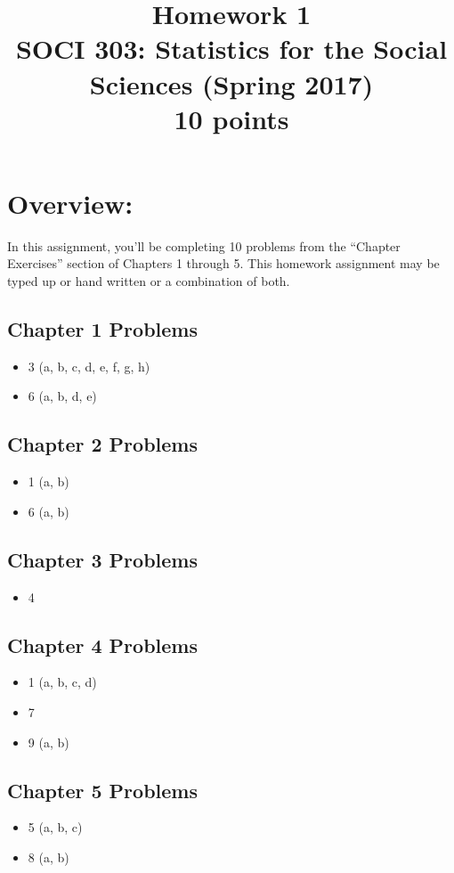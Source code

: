 \documentclass{article}
\begin{document}
\title{Homework 1\\ SOCI 303: Statistics for the Social Sciences (Spring 2017) \\ {\large{10 points}}}
\author[*]{}
\date{}
\maketitle



\section*{Overview:}
In this assignment, you'll be completing 10 problems from the ``Chapter Exercises'' section of Chapters 1 through 5. This homework assignment may be typed up or hand written or a combination of both.

\subsection*{Chapter 1 Problems}
\begin{itemize}
\item 3 (a, b, c, d, e, f, g, h) 
\item 6 (a, b, d, e) 
\end{itemize}

\subsection*{Chapter 2 Problems}
\begin{itemize}
\item 1 (a, b) 
\item 6 (a, b) 
\end{itemize}

\subsection*{Chapter 3 Problems}
\begin{itemize}
\item 4
\end{itemize}

\subsection*{Chapter 4 Problems}
\begin{itemize}
\item 1 (a, b, c, d) 
\item 7 
\item 9 (a, b) 
\end{itemize}

\subsection*{Chapter 5 Problems}
\begin{itemize}
\item 5 (a, b, c) 
\item 8 (a, b) 
\end{itemize}
\end{document}

